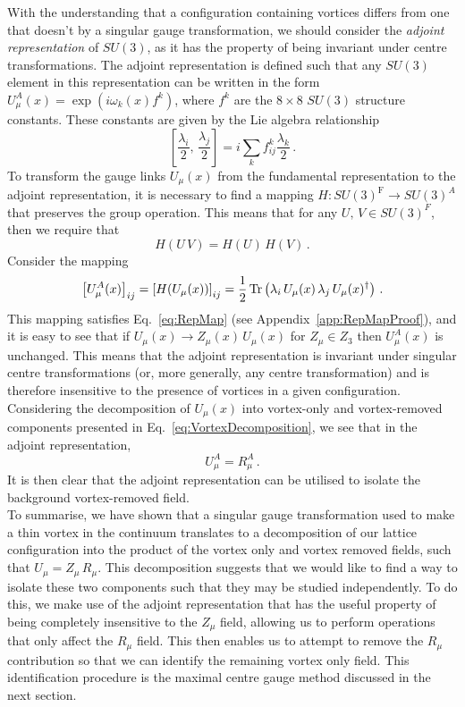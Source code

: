 With the understanding that a configuration containing vortices differs from one that doesn't by a singular gauge transformation, we should consider the \textit{adjoint representation} of $SU(3)$, as it has the property of being invariant under centre transformations. The adjoint representation is defined such that any $SU(3)$ element in this representation can be written in the form $U^A_\mu(x) = \exp\left(i \omega_k(x) f^k\right)$, where $f^k$ are the $8\times 8$ $SU(3)$ structure constants. These constants are given by the Lie algebra relationship
%
\begin{equation}
\left[\frac{\lambda_i}{2},\,\frac{\lambda_j}{2}\right] = i\sum_k f_{ij}^{k}\frac{\lambda_k}{2}\, .
\end{equation}
%
To transform the gauge links $U_\mu(x)$ from the fundamental representation to the adjoint representation, it is necessary to find a mapping $H:SU(3)^\text{F}\rightarrow SU(3)^A$ that preserves the group operation. This means that for any $U,\,V \in SU(3)^F$, then we require that
%
\begin{equation}
H(U\,V) = H(U)\,H(V)\, .
\label{eq:RepMap}
\end{equation}
%
Consider the mapping
%
\begin{equation}
\left[U_\mu^A(x)\right]_{ij} = \left[H(U_\mu(x))\right]_{ij} = \frac{1}{2}\operatorname{Tr}\left(\lambda_i \, U_\mu(x) \, \lambda_j\, U_\mu(x)^\dagger\right)\, .
\label{eq:AdjointRep}
\end{equation}
%
This mapping satisfies Eq.~\eqref{eq:RepMap} (see Appendix~\ref{app:RepMapProof}), and it is easy to see that if $U_\mu(x)\rightarrow Z_\mu(x)\, U_\mu(x)$ for $Z_\mu\in Z_3$ then $U^A_\mu(x)$ is unchanged. This means that the adjoint representation is invariant under singular centre transformations (or, more generally, any centre transformation) and is therefore insensitive to the presence of vortices in a given configuration. Considering the decomposition of $U_\mu(x)$ into vortex-only and vortex-removed components presented in Eq.~\eqref{eq:VortexDecomposition}, we see that in the adjoint representation, 
%
\begin{equation}
U_\mu^A = R_\mu^A\, .
\end{equation}
%
It is then clear that the adjoint representation can be utilised to isolate the background vortex-removed field.\\

To summarise, we have shown that a singular gauge transformation used to make a thin vortex in the continuum translates to a decomposition of our lattice configuration into the product of the vortex only and vortex removed fields, such that $U_\mu = Z_\mu\,R_\mu$. This decomposition suggests that we would like to find a way to isolate these two components such that they may be studied independently. To do this, we make use of the adjoint representation that has the useful property of being completely insensitive to the $Z_\mu$ field, allowing us to perform operations that only affect the $R_\mu$ field. This then enables us to attempt to remove the $R_\mu$ contribution so that we can identify the remaining vortex only field. This identification procedure is the maximal centre gauge method discussed in the next section. 
 
